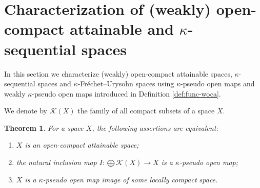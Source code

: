 \documentclass[preprint,11pt]{elsarticle}
\def\dag-{$\kappa$-pseudo open }
\newtheorem{theorem}{Theorem}[section]
\newtheorem{definition}[theorem]{Definition}
\numberwithin{equation}{section}
\numberwithin{theorem}{section}
\newcommand{\KK}{\mathcal{K}}
\newcommand{\SM}{{\setminus}}
\begin{document}

\section{Characterization of (weakly) open-compact attainable and $\kappa$-sequential spaces} \label{sec:character-oca}




In this section we characterize (weakly) open-compact attainable spaces, $\kappa$-sequential spaces and $\kappa$-Fr\'{e}chet--Urysohn spaces using  $\kappa$-pseudo open maps and weakly $\kappa$-pseudo open maps introduced in Definition \ref{def:func-woca}.

We denote by $\KK(X)$ the family of all compact subsets of a space $X$.



\begin{theorem} \label{t:charact-oca}
For a space $X$, the following assertions are equivalent:
\begin{enumerate}
\item[{\rm(i)}] $X$ is an open-compact  attainable space;
\item[{\rm(ii)}] the natural inclusion map $I: \bigoplus\KK(X)\to X$ is a  $\kappa$-pseudo open  map;
\item[{\rm(iii)}] $X$ is a  $\kappa$-pseudo open map image of some locally compact space.
\end{enumerate}
\end{theorem}
\end{document}
